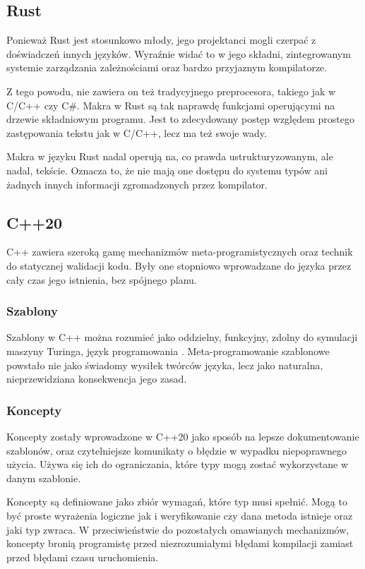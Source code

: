 \subsection {Rust}
Ponieważ Rust jest stosunkowo młody, jego projektanci mogli czerpać z doświadczeń innych języków. Wyraźnie widać to w jego składni, zintegrowanym systemie zarządzania zależnościami oraz bardzo przyjaznym kompilatorze.\par
Z tego powodu, nie zawiera on też tradycyjnego preprocesora, takiego jak w C/C++ czy C\#. Makra w Rust są tak naprawdę funkcjami operującymi na drzewie składniowym programu. Jest to zdecydowany postęp względem prostego zastępowania tekstu jak w C/C++, lecz ma też swoje wady.\par
Makra w języku Rust nadal operują na, co prawda ustrukturyzowanym, ale nadal, tekście. Oznacza to, że nie mają one dostępu do systemu typów ani żadnych innych informacji zgromadzonych przez kompilator.\par
\subsection{C++20}
C++ zawiera szeroką gamę mechanizmów meta-programistycznych oraz technik do statycznej walidacji kodu. Były one stopniowo wprowadzane do języka przez cały czas jego istnienia, bez spójnego planu.\par
\subsubsection{Szablony}
Szablony w C++ można rozumieć jako oddzielny, funkcyjny, zdolny do symulacji maszyny Turinga, język programowania \cite{template_turing_complete}. Meta-programowanie szablonowe powstało nie jako świadomy wysiłek twórców języka, lecz jako naturalna, nieprzewidziana konsekwencja jego zasad.\par
\subsubsection{Koncepty}
Koncepty zostały wprowadzone w C++20 jako sposób na lepsze dokumentowanie szablonów, oraz czytelniejsze komunikaty o błędzie w wypadku niepoprawnego użycia. Używa się ich do ograniczania, które typy mogą zostać wykorzystane w danym szablonie.\par
Koncepty są definiowane jako zbiór wymagań, które typ musi spełnić. Mogą to być proste wyrażenia logiczne jak i weryfikowanie czy dana metoda istnieje oraz jaki typ zwraca. W przeciwieństwie do pozostałych omawianych mechanizmów, koncepty bronią programistę przed niezrozumiałymi błędami kompilacji zamiast przed błędami czasu uruchomienia.\par
